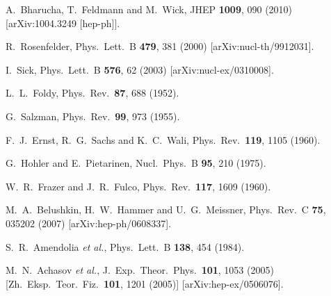\documentclass[12pt]{article}
\begin{document}
\begin{thebibliography}{99}
  A.~Bharucha, T.~Feldmann and M.~Wick,
  JHEP {\bf 1009}, 090 (2010)
  [arXiv:1004.3249 [hep-ph]].
  
  R.~Rosenfelder,
  Phys.\ Lett.\  B {\bf 479}, 381 (2000)
  [arXiv:nucl-th/9912031].

  I.~Sick,
  Phys.\ Lett.\  B {\bf 576}, 62 (2003)
  [arXiv:nucl-ex/0310008].

  L.~L.~Foldy,
  Phys.\ Rev.\  {\bf 87}, 688 (1952).

  G.~Salzman,
  Phys.\ Rev.\  {\bf 99}, 973 (1955).

  F.~J.~Ernst, R.~G.~Sachs and K.~C.~Wali,
  Phys.\ Rev.\  {\bf 119}, 1105 (1960).

  G.~Hohler and E.~Pietarinen,
  Nucl.\ Phys.\  B {\bf 95}, 210 (1975).

  W.~R.~Frazer and J.~R.~Fulco,
  Phys.\ Rev.\  {\bf 117}, 1609 (1960).

  M.~A.~Belushkin, H.~W.~Hammer and U.~G.~Meissner,
  Phys.\ Rev.\  C {\bf 75}, 035202 (2007)
  [arXiv:hep-ph/0608337].



  S.~R.~Amendolia {\it et al.},
  Phys.\ Lett.\  B {\bf 138}, 454 (1984).

  M.~N.~Achasov {\it et al.},
  J.\ Exp.\ Theor.\ Phys.\  {\bf 101}, 1053 (2005)
  [Zh.\ Eksp.\ Teor.\ Fiz.\  {\bf 101}, 1201 (2005)]
  [arXiv:hep-ex/0506076].


\end{thebibliography}
\end{document}
